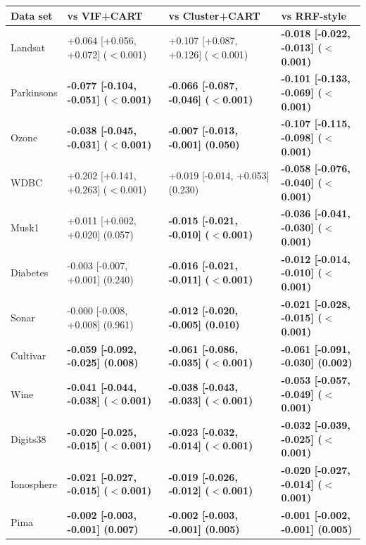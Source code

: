 \begin{tabular}{llll}
\toprule
Data set & vs VIF+CART & vs Cluster+CART & vs RRF-style \\
\midrule
Landsat & +0.064 [+0.056, +0.072] ($<$0.001) & +0.107 [+0.087, +0.126] ($<$0.001) & \textbf{-0.018 [-0.022, -0.013] ($<$0.001)} \\
Parkinsons & \textbf{-0.077 [-0.104, -0.051] ($<$0.001)} & \textbf{-0.066 [-0.087, -0.046] ($<$0.001)} & \textbf{-0.101 [-0.133, -0.069] ($<$0.001)} \\
Ozone & \textbf{-0.038 [-0.045, -0.031] ($<$0.001)} & \textbf{-0.007 [-0.013, -0.001] (0.050)} & \textbf{-0.107 [-0.115, -0.098] ($<$0.001)} \\
WDBC & +0.202 [+0.141, +0.263] ($<$0.001) & +0.019 [-0.014, +0.053] (0.230) & \textbf{-0.058 [-0.076, -0.040] ($<$0.001)} \\
Musk1 & +0.011 [+0.002, +0.020] (0.057) & \textbf{-0.015 [-0.021, -0.010] ($<$0.001)} & \textbf{-0.036 [-0.041, -0.030] ($<$0.001)} \\
Diabetes & -0.003 [-0.007, +0.001] (0.240) & \textbf{-0.016 [-0.021, -0.011] ($<$0.001)} & \textbf{-0.012 [-0.014, -0.010] ($<$0.001)} \\
Sonar & -0.000 [-0.008, +0.008] (0.961) & \textbf{-0.012 [-0.020, -0.005] (0.010)} & \textbf{-0.021 [-0.028, -0.015] ($<$0.001)} \\
Cultivar & \textbf{-0.059 [-0.092, -0.025] (0.008)} & \textbf{-0.061 [-0.086, -0.035] ($<$0.001)} & \textbf{-0.061 [-0.091, -0.030] (0.002)} \\
Wine & \textbf{-0.041 [-0.044, -0.038] ($<$0.001)} & \textbf{-0.038 [-0.043, -0.033] ($<$0.001)} & \textbf{-0.053 [-0.057, -0.049] ($<$0.001)} \\
Digits38 & \textbf{-0.020 [-0.025, -0.015] ($<$0.001)} & \textbf{-0.023 [-0.032, -0.014] ($<$0.001)} & \textbf{-0.032 [-0.039, -0.025] ($<$0.001)} \\
Ionosphere & \textbf{-0.021 [-0.027, -0.015] ($<$0.001)} & \textbf{-0.019 [-0.026, -0.012] ($<$0.001)} & \textbf{-0.020 [-0.027, -0.014] ($<$0.001)} \\
Pima & \textbf{-0.002 [-0.003, -0.001] (0.007)} & \textbf{-0.002 [-0.003, -0.001] (0.005)} & \textbf{-0.001 [-0.002, -0.001] (0.005)} \\
\bottomrule
\end{tabular}
